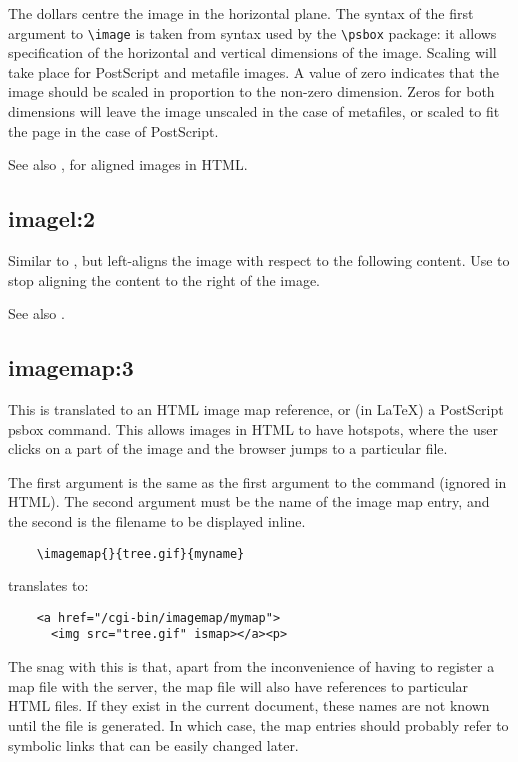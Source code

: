 The dollars centre the image in the horizontal plane. The syntax
of the first argument to \verb$\image$ is taken from syntax used by the \verb$\psbox$\rtfsp
package: it allows specification of the horizontal and vertical
dimensions of the image. Scaling will take place for PostScript
and metafile images. A value of zero indicates that the image should
be scaled in proportion to the non-zero dimension. Zeros for both
dimensions will leave the image unscaled in the case of metafiles,
or scaled to fit the page in the case of PostScript.

See also ,  for aligned images in
HTML.

\subsection*{imagel:2}\label{imagel}

Similar to , but left-aligns the image with respect to the following
content. Use  to stop aligning the content to the right of the image.

See also .

\subsection*{imagemap:3}\label{imagemap}

This is translated to an HTML image map reference, or (in LaTeX) a PostScript psbox
command. This allows images in HTML to have hotspots, where the user clicks on a
part of the image and the browser jumps to a particular file.

The first argument is the same as the first argument to the \rtfsp
command (ignored in HTML). The second argument must be the name of the
image map entry, and the second is the filename to be displayed inline.

\begin{verbatim}
    \imagemap{}{tree.gif}{myname}
\end{verbatim}

translates to:

\begin{verbatim}
    <a href="/cgi-bin/imagemap/mymap">
      <img src="tree.gif" ismap></a><p>
\end{verbatim}

The snag with this is that, apart from the inconvenience of having to
register a map file with the server, the map file will also have
references to particular HTML files. If they exist in the current
document, these names are not known until the file is generated. In which case, the
map entries should probably refer to symbolic links that can be easily
changed later.

